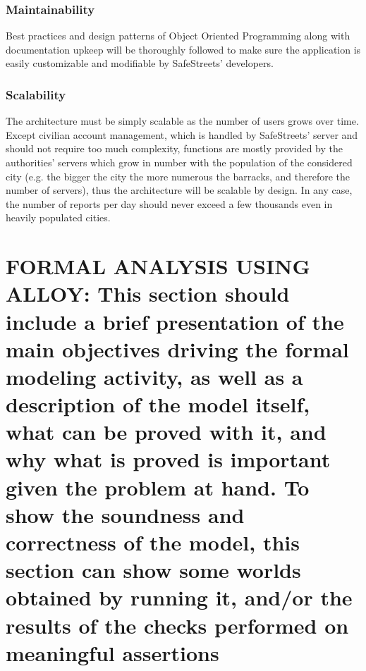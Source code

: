 \documentclass[12pt,a4paper]{article}
\begin{document}
\subsubsection{Maintainability}
Best practices and design patterns of Object Oriented Programming along with documentation upkeep will be thoroughly followed to make sure the application is easily customizable and modifiable by SafeStreets' developers.
\subsubsection{Scalability}
The architecture must be simply scalable as the number of users grows over time. Except civilian account management, which is handled by SafeStreets' server and should not require too much complexity, functions are mostly provided by the authorities' servers which grow in number with the population of the considered city (e.g. the bigger the city the more numerous the barracks, and therefore the number of servers), thus the architecture will be scalable by design. In any case, the number of reports per day should never exceed a few thousands even in heavily populated cities.
\section{FORMAL	ANALYSIS	USING	ALLOY: This	section	should include	a	brief	presentation	of the	
main	objectives	driving	the	formal	modeling	activity, as	well	as	a	description	of the	model	
itself,	what	can	be	proved with	it, and	why	what	is	proved is	important	given	the	problem	at	
hand. To	show	 the	soundness	and	correctness	of	the model,	 this	section	can	show	some
worlds	obtained	by	running	it,	and/or	the	results	of	the	checks	performed	on	meaningful	
assertions}
\end{document}
